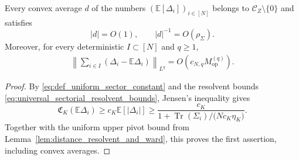 \documentclass[EJP, preprint, NODS, nobera, nofontexpansion]{ejpecp}
\DeclareMathOperator{\op}{op}
\DeclareMathOperator{\tr}{Tr}
\begin{document}
\begin{lemma}
\label{lem:operator_expected_pivots}
Every convex average $d$ of the numbers $(\mathbb E[\Delta_i])_{i\in[N]}$ belongs to
$\mathcal C_Z\setminus\{0\}$ and satisfies
\[
 |d|=O(1),\qquad |d|^{-1}=O(\rho_\Sigma).
\]
Moreover, for every deterministic $I\subset[N]$ and $q\geq1$,
\begin{align}\label{eq:partial_schur_pivot_concentration}
 \left\|\sum_{i\in I}(\Delta_i-\mathbb E\Delta_i)\right\|_{L^q}
 =O\!\left(c_{N,q}M_{\op}^{(q)}\right).
\end{align}
\end{lemma}
\begin{proof}
By \eqref{eq:def_uniform_sector_constant} and the resolvent bounds
\eqref{eq:universal_sectorial_resolvent_bounds}, Jensen's inequality gives
\[
 \mathfrak C_K(\mathbb E\Delta_i)
 \geq c_K\mathbb E\left[|\Delta_i|\right]
 \geq\frac{c_K}
 {1+\tr(\Sigma_i)/\bigl(Nc_K\eta_K\bigr)}.
\]
Together with the uniform upper pivot bound from
Lemma~\ref{lem:distance_resolvent_and_ward}, this proves the first
assertion, including convex averages.


\end{proof}
\end{document}
